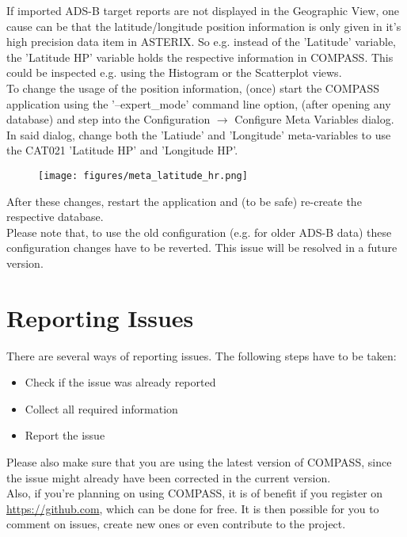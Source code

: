 If imported ADS-B target reports are not displayed in the Geographic View, one cause can be that the latitude/longitude position information is only given in it's high precision data item in ASTERIX. So e.g. instead of the 'Latitude' variable, the 'Latitude HP' variable holds the respective information in COMPASS. This could be inspected e.g. using the Histogram or the Scatterplot views. \\

To change the usage of the position information, (once) start the COMPASS application using the '--expert\_mode' command line option, (after opening any database) and step into the Configuration $\rightarrow$ Configure Meta Variables dialog. \\

In said dialog, change both the 'Latiude' and 'Longitude' meta-variables to use the CAT021 'Latitude HP' and 'Longitude HP'.

\begin{figure}[H]
    \texttt{[image: figures/meta\_latitude\_hr.png]}
\end{figure}

After these changes, restart the application and (to be safe) re-create the respective database. \\

Please note that, to use the old configuration (e.g. for older ADS-B data) these configuration changes have to be reverted. This issue will be resolved in a future version.



\section{Reporting Issues}

There are several ways of reporting issues. The following steps have to be taken:

\begin{itemize}  
\item Check if the issue was already reported
\item Collect all required information
\item Report the issue
\end{itemize} 

Please also make sure that you are using the latest version of COMPASS, since the issue might already have been corrected in the current version. \\

Also, if you're planning on using COMPASS, it is of benefit if you register on \url{https://github.com}, which can be done for free. It is then possible for you to comment on issues, create new ones or even contribute to the project.

